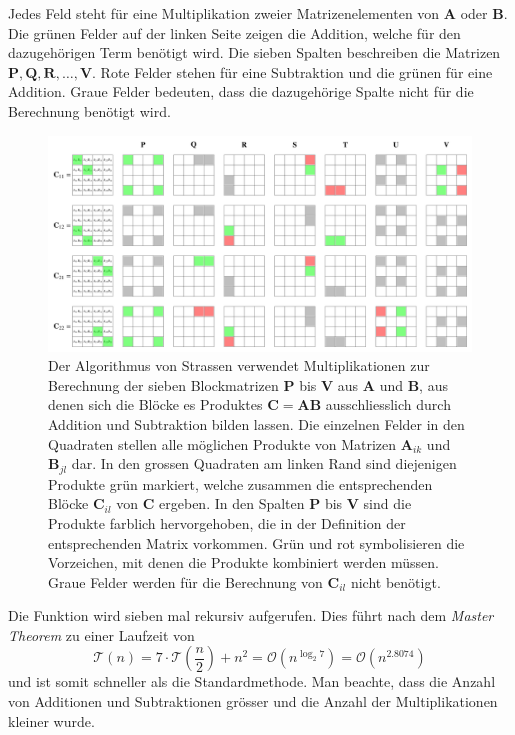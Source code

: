 Jedes Feld steht f\"ur eine Multiplikation zweier Matrizenelementen von $\mathbf{A}$ oder $\mathbf{B}$.
Die gr\"unen Felder auf der linken Seite
zeigen die Addition, welche f\"ur den dazugeh\"origen Term ben\"otigt wird.
Die sieben Spalten beschreiben die Matrizen $\mathbf{P,Q,R, \ldots, V}$.
Rote Felder stehen f\"ur eine Subtraktion und die gr\"unen f\"ur eine Addition.
Graue Felder bedeuten, dass die dazugehörige Spalte nicht für die Berechnung benötigt wird.
\begin{figure}
	\center
	\includegraphics[width=\linewidth]{papers/multiplikation/images/strassen.pdf}
	\caption{Der Algorithmus von Strassen verwendet Multiplikationen zur Berechnung der sieben Blockmatrizen $\mathbf{P}$ bis $\mathbf{V}$ aus $\mathbf{A}$ und $\mathbf{B}$, aus denen sich die Blöcke es Produktes $\mathbf{C}=\mathbf{AB}$ ausschliesslich durch Addition und Subtraktion bilden lassen. Die einzelnen Felder in den Quadraten stellen alle möglichen Produkte von Matrizen $\mathbf{A}_{ik}$ und $\mathbf{B}_{jl}$ dar. In den grossen Quadraten am linken Rand sind diejenigen Produkte grün markiert, welche zusammen die entsprechenden Blöcke $\mathbf{C}_{il}$ von $\mathbf{C}$ ergeben. In den Spalten $\mathbf{P}$ bis $\mathbf{V}$ sind die Produkte farblich hervorgehoben, die in der Definition der entsprechenden Matrix vorkommen. Grün und rot symbolisieren die Vorzeichen, mit denen die Produkte kombiniert werden müssen. Graue Felder werden für die Berechnung von $\mathbf{C}_{il}$ nicht benötigt.}
	\label{multiplikation:fig:strassen}
\end{figure}

Die Funktion wird sieben mal rekursiv aufgerufen.
Dies f\"uhrt nach dem \textit{Master Theorem} zu einer Laufzeit von
\begin{equation} \label{multiplikation:eq:laufzeitstrassen}
\mathcal{T}(n) =
7 \cdot \mathcal{T}\left(\frac{n}{2}\right) + n^2  = \mathcal{O}(n^{\log_2 7} ) = \mathcal{O}(n^{2.8074}  )
\end{equation}
und ist somit schneller als die Standardmethode.
Man beachte, dass die Anzahl von Additionen und Subtraktionen gr\"osser und die Anzahl der Multiplikationen kleiner wurde.

